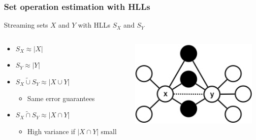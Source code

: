 \documentclass{beamer}
\newcommand{\algoname}[1]{\textnormal{\textsc{#1}}}
\begin{document}

\begin{frame}
\frametitle{Set operation estimation with \algoname{HLL}s}

Streaming sets $X$ and $Y$ with \algoname{HLL}s $S_X$ and $S_Y$
\begin{columns}
\begin{column}{0.5\textwidth}
	\begin{itemize}
		\item $S_X \approx |X|$
		\item $S_Y \approx |Y|$
		\item $S_X \widetilde{\cup} S_Y \approx |X \cup Y|$
		\begin{itemize}
			\item Same error guarantees
		\end{itemize}
		\item $S_X \widetilde{\cap} S_Y \approx |X \cap Y|$
		\begin{itemize}
			\item High variance if $|X \cap Y|$ small
		\end{itemize}
	\end{itemize}
\end{column}
\begin{column}{0.5\textwidth}  %
	\begin{center}
		\includegraphics[width=1.0\textwidth]{edge_local}
	\end{center}
\end{column}

\end{columns}


\end{frame}
\end{document}
